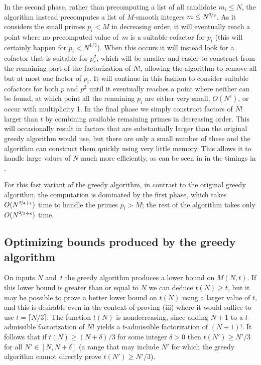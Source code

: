\documentclass[10pt,a4paper,reqno]{amsart}
\numberwithin{equation}{section}
\theoremstyle{plain}
\theoremstyle{definition}
\begin{document}
In the second phase, rather than precomputing a list of all candidate $m_i\le N$, the algorithm instead precomputes a list of $M$-smooth integers $m\le N^{\nicefrac{2}{3}}$.  As it considers the small primes $p_i < M$ in decreasing order, it will eventually reach a point where no precomputed value of~$m$ is a suitable cofactor for $p_i$ (this will certainly happen for $p_i < N^{1/3}$).  When this occurs it will instead look for a cofactor that is suitable for $p_i^2$, which will be smaller and easier to construct from the remaining part of the factorization of $N!$, allowing the algorithm to remove all but at most one factor of $p_i$.  It will continue in this fashion to consider suitable cofactors for both $p$ and $p^2$ until it eventually reaches a point where neither can be found, at which point all the remaining $p_i$ are either very small, $O(N^\epsilon)$, or occur with multiplicity 1.  In the final phase we simply construct factors of $N!$ larger than $t$ by combining available remaining primes in decreasing order.  This will occasionally result in factors that are substantially larger than the original greedy algorithm would use, but there are only a small number of these and the algorithm can construct them quickly using very little memory.  This allows it to handle large values of $N$ much more efficiently, as can be seen in in the timings in .

For this fast variant of the greedy algorithm, in contrast to the original greedy algorithm, the computation is dominated by the first phase, which takes $O(N^{\nicefrac{3}{4}+\epsilon})$ time to handle the primes $p_i>M$; the rest of the algorithm takes only $O(N^{\nicefrac{2}{3}+\epsilon})$ time.

\subsection{Optimizing bounds produced by the greedy algorithm}
On inputs $N$ and~$t$ the greedy algorithm produces a lower bound on $M(N,t)$. If this lower bound is greater than or equal to $N$ we can deduce $t(N)\ge t$, but it may be possible to prove a better lower bound on $t(N)$ using a larger value of $t$, and this is desirable even in the context of proving (iii) where it would suffice to use $t=\lceil N/3\rceil$.  The function $t(N)$ is nondecreasing, since adding $N+1$ to a $t$-admissible factorization of $N!$ yields a $t$-admissible factorization of $(N+1)!$. It follows that if $t(N) \ge (N+\delta)/3$ for some integer $\delta >0$ then $t(N')\ge N'/3$ for all $N'\in [N,N+\delta]$ (a range that may include $N'$ for which the greedy algorithm cannot directly prove $t(N')\ge N'/3$).
\end{document}
